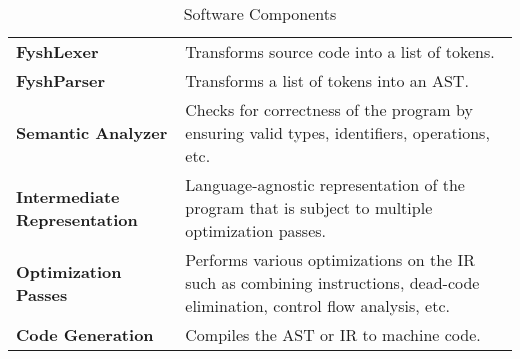 \newcommand{\sw}[2]{%
	\textbf{#1} & #2 \\%
	\hline%
}
\begin{table}[H]
	\begin{tabularx}{\textwidth}{| a | x |}
		\hline
		 &  \\
		\hline
		\sw{FyshLexer}{Transforms source code into a list of tokens.}
		\sw{FyshParser}{Transforms a list of tokens into an AST.}
		\sw{Semantic Analyzer}{%
			Checks for correctness of the program by ensuring valid types,
			identifiers, operations, etc.}
		\sw{Intermediate Representation}{%
			Language-agnostic representation of the program that is subject to
			multiple optimization passes.}
		\sw{Optimization Passes}{%
			Performs various optimizations on the IR such as combining instructions,
			dead-code elimination, control flow analysis, etc.}
		\sw{Code Generation}{Compiles the AST or IR to machine code.}
	\end{tabularx}
	\label{Tab:software}
	\caption{Software Components}
\end{table}


